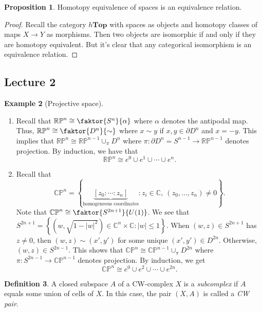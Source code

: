 \documentclass[10pt,letterpaper,cm]{nupset}
\theoremstyle{definition}
\newtheorem{definition}{Definition}[subsection]
\newtheorem{exmp}[definition]{Example}
\theoremstyle{theorem}
\newtheorem{prop}[definition]{Proposition}
\theoremstyle{remark}
\newcommand{\C}{\mathbb C}
\newcommand{\CP}{\mathbb{CP}}
\newcommand{\RP}{\mathbb{RP}}
\newcommand{\1}{\mathbb{1}}
\newcommand{\0}{\vec 0}
\begin{document}
\begin{prop}
Homotopy equivalence of spaces is an equivalence relation.
\end{prop}
\begin{proof}
Recall the category $h\mathbf{Top}$ with spaces as objects and homotopy classes of maps $X \to Y$ as morphisms. Then two objects are isomorphic if and only if they are homotopy equivalent. But it's clear that any categorical isomorphism is an equivalence relation.  
\end{proof}

\subsection{Lecture 2}

\begin{exmp}[Projective space]
\begin{enumerate}
\item Recall that $\RP^n \cong \faktor{S^n}{\alpha}$ where $\alpha$ denotes the antipodal map. Thus, $\RP^n \cong \faktor{D^n}{\sim}$ where $x\sim y$ if $x,y\in \partial{D^n}$ and $x={-y}$. This implies that $\RP^n \cong \RP^{n-1} \cup_{\pi} D^n$ where $\pi : \partial{D^n} = S^{n-1} \to \RP^{n-1}$ denotes projection. By induction, we have that $$\RP^n \cong e^0 \cup e^1 \cup \cdots \cup e^n.$$
\item Recall that $$\CP^n = \left\{\underbrace{[z_0 : \cdots : z_n]}_{\text{homogeneous coordinates}} : z_i \in \C, \ (z_0, \ldots, z_n) \ne 0\right\}.$$ Note that $\CP^n \cong \faktor{S^{2n+1}}{U(1)}$.
We see that $S^{2n+1} = \left\{(w, \sqrt{1-\left\lvert{w}\right\rvert^2}) \in \C^n \times \C : \left\lvert{w}\right\rvert \leq 1\right\}$. When $\left(w,z\right) \in S^{2n+1}$ has $z\ne 0$, then $\left(w,z\right) \sim \left(x', y'\right)$ for some unique $\left(x', y'\right)\in D^{2n}$. Otherwise, $\left(w,z\right) \in S^{2n-1}$. This shows that $\CP^n \cong \CP^{n-1} \cup_{\pi} D^{2n}$ where $\pi : S^{2n-1} \to \CP^{n-1}$ denotes projection.  By induction, we get $$\CP^n \cong e^0 \cup e^2 \cup \cdots \cup e^{2n}.$$
\end{enumerate}
\end{exmp}

\begin{definition}
A closed subspace $A$ of a CW-complex $X$ is a \textit{subcomplex} if $A$ equals some union of cells of $X$. In this case, the pair $\left(X, A\right)$ is called a \textit{CW pair}.
\end{definition}
\end{document}
